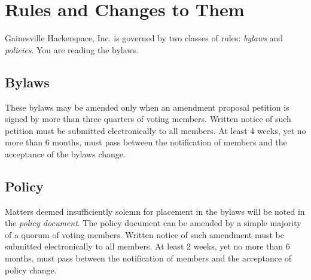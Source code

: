 \documentclass[10pt,letterpaper,titlepage]{article}
\newcommand\corpname{Gainesville Hackerspace, Inc.}
\begin{document}
\section{Rules and Changes to Them}
\label{rules}

\corpname{} is governed by two classes of rules: \emph{bylaws} and
\emph{policies}. You are reading the bylaws.

\subsection{Bylaws}

These bylaws may be amended only when an amendment proposal petition is signed
by more than three quarters of voting members.  Written notice of such petition
must be submitted electronically to all members.  At least 4 weeks, yet no more
than 6 months, must pass between the notification of members and the acceptance
of the bylaws change.

\subsection{Policy}

Matters deemed insufficiently solemn for placement in the bylaws will
be noted in the \emph{policy document}.  The policy document can be
amended by a simple majority of a quorum of voting members.  Written
notice of such amendment must be submitted electronically to all
members.  At least 2 weeks, yet no more than 6 months, must pass
between the notification of members and the acceptance of policy
change.
\end{document}
